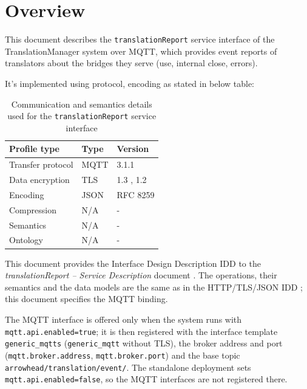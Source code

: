 \documentclass[a4paper]{arrowhead}
\begin{document}
\section{Overview}
\label{sec:overview}

This document describes the \texttt{translationReport} service interface of the TranslationManager system over MQTT, which provides event reports of translators about the bridges they serve (use, internal close, errors).

It's implemented using protocol, encoding as stated in below table:
\begin{table}[ht!]
  \centering
  \begin{tabular}{|l|l|l|}
    \hline
    \rowcolor{gray!33} Profile type & Type & Version \\ \hline
    Transfer protocol & MQTT & 3.1.1 \cite{mqtt311} \\ \hline
    Data encryption & TLS & 1.3 \cite{rfc8446}, 1.2 \cite{rfc5246} \\ \hline
    Encoding & JSON & RFC 8259 \cite{rfc8259} \\ \hline
    Compression & N/A & - \\ \hline
    Semantics & N/A & - \\ \hline
    Ontology & N/A & - \\ \hline
  \end{tabular}
  \caption{Communication and semantics details used for the \texttt{translationReport} service interface}
  \label{tab:comunication_semantics_profile}
\end{table}

This document provides the Interface Design Description IDD to the \textit{translationReport -- Service Description} document \cite{tm-translationReport-sd}.
The operations, their semantics and the data models are the same as in the HTTP/TLS/JSON IDD \cite{tm-translationReport-http-idd}; this document specifies the MQTT binding.

The MQTT interface is offered only when the system runs with \texttt{mqtt.api.enabled=true}; it is then registered with the interface template \texttt{generic\_\allowbreak{}mqtts} (\texttt{generic\_\allowbreak{}mqtt} without TLS), the broker address and port (\texttt{mqtt.\allowbreak{}broker.\allowbreak{}address}, \texttt{mqtt.\allowbreak{}broker.\allowbreak{}port}) and the base topic \texttt{arrowhead/\allowbreak{}translation/\allowbreak{}event/\allowbreak{}}. The standalone deployment sets \texttt{mqtt.\allowbreak{}api.\allowbreak{}enabled=\allowbreak{}false}, so the MQTT interfaces are not registered there.
\end{document}
